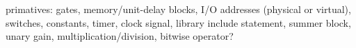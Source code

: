 primatives: gates, memory/unit-delay blocks, I/O addresses (physical or virtual), switches, constants, timer, clock signal, library include statement, summer block, unary gain, multiplication/division, bitwise operator?
